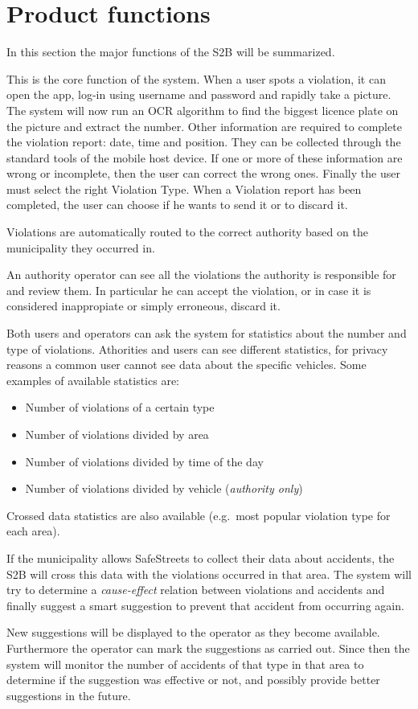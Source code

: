 \section{Product functions}
In this section the major functions of the S2B will be summarized.

This is the core function of the system. When a user spots a violation, it can
open the app, log-in using username and password and rapidly take a picture. The
system will now run an OCR algorithm to find the biggest licence plate on the
picture and extract the number. Other information are required to complete the
violation report: date, time and position. They can be collected through the
standard tools of the mobile host device. If one or more of these information
are wrong or incomplete, then the user can correct the wrong ones. Finally the
user must select the right Violation Type. When a Violation report has been
completed, the user can choose if he wants to send it or to discard it.

Violations are automatically routed to the correct authority based on the
municipality they occurred in.

An authority operator can see all the violations the authority is responsible
for and review them. In particular he can accept the violation, or in case it is
considered inappropiate or simply erroneous, discard it.

Both users and operators can ask the system for statistics about the number and
type of violations.
Athorities and users can see different statistics, for privacy reasons a common
user cannot see data about the specific vehicles.
Some examples of available statistics are:
\begin{itemize}[noitemsep]
    \item Number of violations of a certain type
    \item Number of violations divided by area
    \item Number of violations divided by time of the day
    \item Number of violations divided by vehicle (\emph{authority only})
\end{itemize}
Crossed data statistics are also available (e.g.\ most popular violation type
for each area).

If the municipality allows SafeStreets to collect their data about accidents,
the S2B will cross this data with the violations occurred in that area.
The system will try to determine a \emph{cause-effect} relation between
violations and accidents and finally suggest a smart suggestion to prevent that
accident from occurring again.

New suggestions will be displayed to the operator as they become available.
Furthermore the operator can mark the suggestions as carried out.
Since then the system will monitor the number of accidents of that type in that
area to determine if the suggestion was effective or not, and possibly provide
better suggestions in the future.